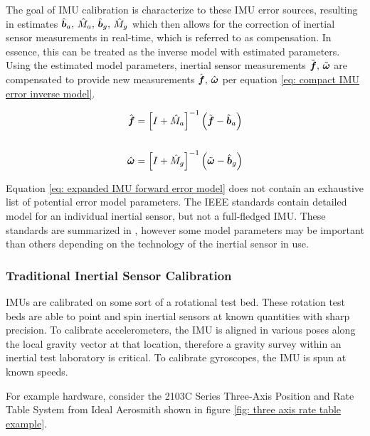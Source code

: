 The goal of IMU calibration is characterize to these IMU error sources, resulting in estimates $\hat{\boldsymbol{b}}_a, \, \hat{M}_a, \, \hat{\boldsymbol{b}}_g, \, \hat{M}_g
$ which then allows for the correction of inertial sensor measurements in real-time, which is referred to as compensation. In essence, this can be treated as the inverse model with estimated parameters. Using the estimated model parameters, inertial sensor measurements $\tilde{\boldsymbol{f}},\,\tilde{\boldsymbol{\omega}}$ are compensated to provide new measurements $\hat{\boldsymbol{f}},\,\hat{\boldsymbol{\omega}}$ per equation \ref{eq: compact IMU error inverse model}.

\begin{align} \label{eq: compact IMU error inverse model}
	\hat{\boldsymbol{f}} &= \left[I + \hat{M}_a\right]^{-1} \left(\tilde{\boldsymbol{f}} - \hat{\boldsymbol{b}}_a\right) \notag\\
	\\
	\hat{\boldsymbol{\omega}} &= \left[I + \hat{M}_g\right]^{-1} \left(\tilde{\boldsymbol{\omega}} - \hat{\boldsymbol{b}}_g\right) \notag
\end{align}

Equation \ref{eq: expanded IMU forward error model} does not contain an exhaustive list of potential error model parameters. The IEEE standards \cite{IEEE_std_1293-2018,IEEE_std_1431-2004,IEEE_std_952-2020,IEEE_std_292-1969,IEEE_std_517-1974,IEEE_std_647-2006,IEEE_std_813-1988} contain detailed model for an individual inertial sensor, but not a full-fledged IMU. These standards are summarized in \cite{GeneralizedFramework}, however some model parameters may be important than others depending on the technology of the inertial sensor in use.


\subsubsection{Traditional Inertial Sensor Calibration}

IMUs are calibrated on some sort of a rotational test bed. These rotation test beds are able to point and spin inertial sensors at known quantities with sharp precision. To calibrate accelerometers, the IMU is aligned in various poses along the local gravity vector at that location, therefore a gravity survey within an inertial test laboratory is critical. To calibrate gyroscopes, the IMU is spun at known speeds.

For example hardware, consider the 2103C Series Three-Axis Position and Rate Table System from Ideal Aerosmith \cite{threeAxisRateTableTable} shown in figure \ref{fig: three axis rate table example}. 


